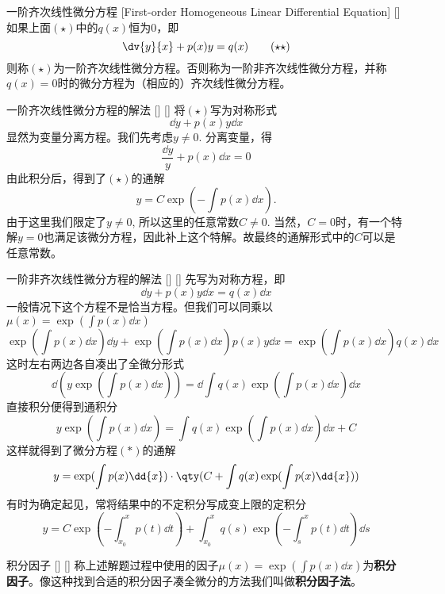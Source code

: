 \documentclass[UTF8]{ctexart}
\begin{document}
        \begin{dfn}
            []
            {一阶齐次线性微分方程}
            [First-order Homogeneous Linear Differential Equation]
            []
            如果上面$(\star)$中的$q(x)$恒为0，即
            \[\dv{y}{x}+p(x)y=q(x)\tag{$\star\star$}\]
            则称$(\star)$为一阶齐次线性微分方程。否则称为一阶非齐次线性微分方程，并称$q(x)=0$时的微分方程为（相应的）齐次线性微分方程。
        \end{dfn}

        \begin{ppt}
            []
            {一阶齐次线性微分方程的解法}
            []
            []
            将$(\star)$写为对称形式
            \[\dd{y}+p(x)y\dd{x}\]
            显然为变量分离方程。我们先考虑$y\neq 0$. 分离变量，得
            \[\frac{\dd{y}}{y}+p(x)\dd{x}=0\]
            由此积分后，得到了$(\star)$的通解
            \[y=C\exp(-\int p(x)\dd{x}).\]
            由于这里我们限定了$y\neq 0$, 所以这里的任意常数$C\neq 0$. 当然，$C=0$时，有一个特解$y=0$也满足该微分方程，因此补上这个特解。故最终的通解形式中的$C$可以是任意常数。
        \end{ppt}

        \begin{ppt}
            []
            {一阶非齐次线性微分方程的解法}
            []
            []
            先写为对称方程，即
            \[\dd{y}+p(x)y\dd{x}=q(x)\dd{x}\tag{$\ast$}\]
            一般情况下这个方程不是恰当方程。但我们可以同乘以$\mu(x)=\exp(\int p(x)\dd{x})$
            \[\exp(\int p(x)\dd{x})\dd{y}+\exp(\int p(x)\dd{x})p(x)y\dd{x}=\exp(\int p(x)\dd{x})q(x)\dd{x}\]
            这时左右两边各自凑出了全微分形式
            \[\dd(y\exp(\int p(x)\dd{x}))=\dd\int q(x)\exp(\int p(x)\dd{x})\dd{x}\]
            直接积分便得到通积分
            \[y\exp(\int p(x)\dd{x})=\int q(x)\exp(\int p(x)\dd{x})\dd{x}+C\]
            这样就得到了微分方程$(\ast)$的通解
            \[y=\exp(\int p(x)\dd{x})\cdot\qty(C+\int q(x)\exp(\int p(x)\dd{x}))\]
            有时为确定起见，常将结果中的不定积分写成变上限的定积分
            \[y=C\exp(-\int_{x_0}^{x}p(t)\dd{t})+\int_{x_0}^{x}q(s)\exp(-\int_{s}^{x}p(t)\dd{t})\dd{s}\]
        \end{ppt}

        \begin{dfn}
            []
            {积分因子}
            []
            []
            称上述解题过程中使用的因子$\mu(x)=\exp(\int p(x)\dd{x})$为\textbf{积分因子}。像这种找到合适的积分因子凑全微分的方法我们叫做\textbf{积分因子法}。
        \end{dfn}
\end{document}

